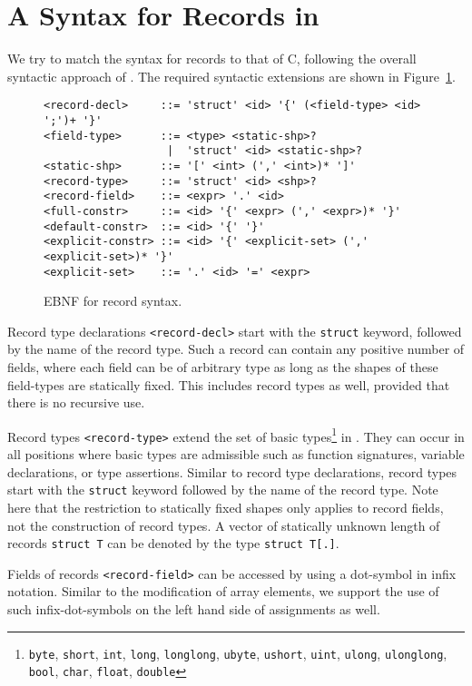
\section{A Syntax for Records in \sac{}}\label{sec:syntax}

We try to match the syntax for records to that of C, following the overall syntactic
approach of \sac{}.
The required syntactic extensions are shown in Figure~\ref{fig:syntax}.

\begin{figure}[hbt]
\begin{verbatim}
<record-decl>     ::= 'struct' <id> '{' (<field-type> <id> ';')+ '}'
<field-type>      ::= <type> <static-shp>?
                   |  'struct' <id> <static-shp>?
<static-shp>      ::= '[' <int> (',' <int>)* ']'
<record-type>     ::= 'struct' <id> <shp>?
<record-field>    ::= <expr> '.' <id>
<full-constr>     ::= <id> '{' <expr> (',' <expr>)* '}'
<default-constr>  ::= <id> '{' '}'
<explicit-constr> ::= <id> '{' <explicit-set> (',' <explicit-set>)* '}'
<explicit-set>    ::= '.' <id> '=' <expr>
\end{verbatim}
\caption{EBNF for \sac{} record syntax.}
\label{fig:syntax}
\end{figure}

Record type declarations \verb|<record-decl>| start with the \texttt{struct} keyword, followed by the name of the record type.
Such a record can contain any positive number of fields, where each field can be of arbitrary type as long as the shapes of these field-types are statically fixed.
This includes record types as well, provided that there is no recursive use.

Record types \verb|<record-type>| extend the set of basic types\footnote{%
\texttt{byte},
\texttt{short},
\texttt{int},
\texttt{long},
\texttt{longlong},
\texttt{ubyte},
\texttt{ushort},
\texttt{uint},
\texttt{ulong},
\texttt{ulonglong},
\texttt{bool},
\texttt{char},
\texttt{float},
\texttt{double}
} in \sac{}. They can occur in all positions where basic types are admissible such as function signatures, variable declarations, or type assertions.
Similar to record type declarations, record types start with the \texttt{struct} keyword followed by the name of the record type.
Note here that the restriction to statically fixed shapes only applies to record fields, not the construction of record types.
A vector of statically unknown length of records \texttt{struct T} can be denoted by the type \texttt{struct T[.]}.

Fields of records \verb|<record-field>| can be accessed by using a dot-symbol in infix notation. Similar to the modification of array elements, we support the use of such infix-dot-symbols on the left hand side of assignments as well.

